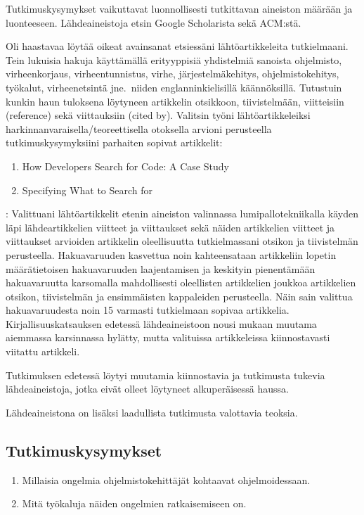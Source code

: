 \documentclass[finnish]{tktltiki2}
\theoremstyle{definition}
\theoremstyle{remark}
\begin{document}
Tutkimuskysymykset vaikuttavat luonnollisesti tutkittavan aineiston määrään ja luonteeseen. Lähdeaineistoja etsin Google Scholarista sekä ACM:stä.

Oli haastavaa löytää oikeat avainsanat etsiessäni lähtöartikkeleita tutkielmaani. Tein lukuisia hakuja käyttämällä erityyppisiä yhdistelmiä sanoista ohjelmisto, virheenkorjaus, virheentunnistus, virhe, järjestelmäkehitys, ohjelmistokehitys, työkalut, virheenetsintä jne.\ niiden englanninkielisillä käännöksillä. Tutustuin kunkin haun tuloksena löytyneen artikkelin otsikkoon, tiivistelmään, viitteisiin (reference) sekä viittauksiin (cited by). Valitsin työni lähtöartikkeleiksi harkinnanvaraisella/teoreettisella otoksella arvioni perusteella tutkimuskysymyksiini parhaiten sopivat artikkelit:

\begin{enumerate}
  \item How Developers Search for Code: A Case Study~\cite{g_search_code}
  \item Specifying What to Search for~\cite{what-to-search-for}
\end{enumerate}:
Valittuani lähtöartikkelit etenin aineiston valinnassa lumipallotekniikalla
käyden läpi lähdeartikkelien viitteet ja viittaukset sekä näiden artikkelien viitteet ja viittaukset arvioiden artikkelin oleellisuutta tutkielmassani otsikon ja tiivistelmän perusteella. Hakuavaruuden kasvettua noin kahteensataan artikkeliin lopetin määrätietoisen hakuavaruuden laajentamisen ja keskityin pienentämään hakuavaruutta karsomalla mahdollisesti oleellisten artikkelien joukkoa artikkelien otsikon, tiivistelmän ja ensimmäisten kappaleiden perusteella. Näin sain valittua hakuavaruudesta noin 15 varmasti tutkielmaan sopivaa artikkelia.  Kirjallisuuskatsauksen edetessä lähdeaineistoon nousi mukaan muutama aiemmassa karsinnassa hylätty, mutta valituissa artikkeleissa kiinnostavasti viitattu artikkeli.

Tutkimuksen edetessä löytyi muutamia kiinnostavia ja tutkimusta tukevia lähdeaineistoja, jotka eivät olleet löytyneet alkuperäisessä haussa.

Lähdeaineistona on lisäksi laadullista tutkimusta valottavia teoksia.

\subsection{Tutkimuskysymykset}
\begin{enumerate}
\item Millaisia ongelmia ohjelmistokehittäjät kohtaavat ohjelmoidessaan.
\item Mitä työkaluja näiden ongelmien ratkaisemiseen on.
\end{enumerate}
\end{document}
